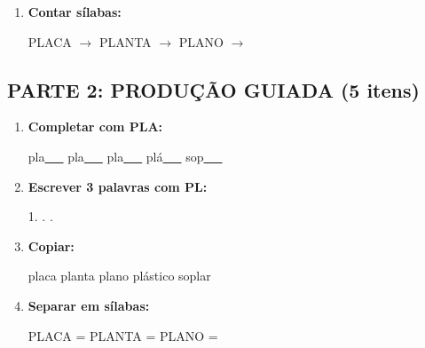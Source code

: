 \begin{exercicio}
\begin{enumerate}
  \item \textbf{Contar sílabas:}
  \begin{center}
  PLACA $\rightarrow$ \underline{\hspace{0.9cm}} \quad PLANTA $\rightarrow$ \underline{\hspace{0.9cm}} \quad PLANO $\rightarrow$ \underline{\hspace{0.9cm}}
  \end{center}

\end{enumerate}

\subsection*{PARTE 2: PRODUÇÃO GUIADA (5 itens)}

\begin{enumerate}[resume]

  \item \textbf{Completar com PLA:}
  \begin{center}
  pla\underline{~~~} \quad pla\underline{~~~} \quad pla\underline{~~~} \quad plá\underline{~~~} \quad sop\underline{~~~}
  \end{center}

  \item \textbf{Escrever 3 palavras com PL:}
  \begin{center}
  1. \underline{\hspace{3cm}} . \underline{\hspace{3cm}} . \underline{\hspace{3cm}}
  \end{center}

  \item \textbf{Copiar:}
  \begin{center}
  placa \quad planta \quad plano \quad plástico \quad soplar
  \end{center}

  \item \textbf{Separar em sílabas:}
  \begin{center}
  PLACA = \underline{\hspace{1cm}} \underline{\hspace{1cm}} \quad PLANTA = \underline{\hspace{1cm}} \underline{\hspace{1cm}} \quad PLANO = \underline{\hspace{1cm}} \underline{\hspace{1cm}}
  \end{center}


\end{enumerate}
\end{exercicio}
